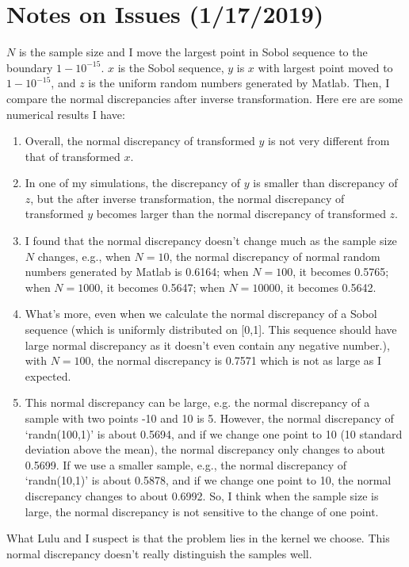\documentclass[12pt]{article}
\begin{document}
\section{Notes on Issues (1/17/2019)}
$N$ is the sample size and I move the largest point in Sobol sequence to the boundary $1-10^{-15}$. $x$ is the Sobol sequence, $y$ is $x$ with largest point moved to $1-10^{-15}$, and $z$ is the uniform random numbers generated by Matlab. Then, I compare the normal discrepancies after inverse transformation. Here ere are some numerical results I have:
\begin{enumerate}
\item
Overall, the normal discrepancy of transformed $y$ is not very different from that of transformed $x$. 
    \item 
    In one of my simulations, the discrepancy of $y$ is smaller than discrepancy of $z$, but the after inverse transformation, the normal discrepancy of transformed $y$ becomes larger than the normal discrepancy of transformed $z$.
    \item
    I found that the normal discrepancy doesn't change much as the sample size $N$ changes, e.g., when $N=10$, the normal discrepancy of normal random numbers generated by Matlab is 0.6164; when $N=100$, it becomes 0.5765; when $N=1000$, it becomes 0.5647; when $N=10000$, it becomes 0.5642. 
    \item
    What's more, even when we calculate the normal discrepancy of a Sobol sequence (which is uniformly distributed on [0,1]. This sequence should have large normal discrepancy as it doesn't even contain any negative number.), with $N=100$, the normal discrepancy is 0.7571 which is not as large as I expected.
    \item
    This normal discrepancy can be large, e.g. the normal discrepancy of a sample with two points -10 and 10 is 5. However, the normal discrepancy of `randn(100,1)' is about 0.5694, and if we change one point to 10 (10 standard deviation above the mean), the normal discrepancy only changes to about 0.5699. If we use a smaller sample, e.g., the normal discrepancy of `randn(10,1)' is about 0.5878,   and if we change one point to 10, the normal discrepancy changes to about 0.6992. So, I think when the sample size is large, the normal discrepancy is not sensitive to the change of one point. 
\end{enumerate}
What Lulu and I suspect is that the problem lies in the kernel we choose. This normal discrepancy doesn't really distinguish the samples well. 
\end{document}
